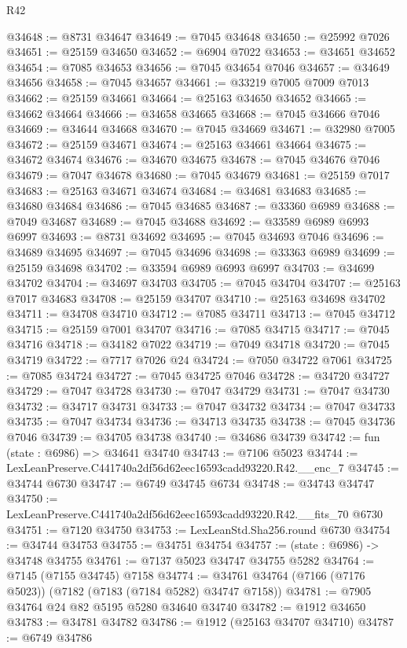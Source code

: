 \begin{lexlean}{R42}
\begin{coremodule}
{@34648 := @8731 @34647
@34649 := @7045 @34648
@34650 := @25992 @7026
@34651 := @25159 @34650
@34652 := @6904 @7022
@34653 := @34651 @34652
@34654 := @7085 @34653
@34656 := @7045 @34654 @7046
@34657 := @34649 @34656
@34658 := @7045 @34657
@34661 := @33219 @7005 @7009 @7013
@34662 := @25159 @34661
@34664 := @25163 @34650 @34652
@34665 := @34662 @34664
@34666 := @34658 @34665
@34668 := @7045 @34666 @7046
@34669 := @34644 @34668
@34670 := @7045 @34669
@34671 := @32980 @7005
@34672 := @25159 @34671
@34674 := @25163 @34661 @34664
@34675 := @34672 @34674
@34676 := @34670 @34675
@34678 := @7045 @34676 @7046
@34679 := @7047 @34678
@34680 := @7045 @34679
@34681 := @25159 @7017
@34683 := @25163 @34671 @34674
@34684 := @34681 @34683
@34685 := @34680 @34684
@34686 := @7045 @34685
@34687 := @33360 @6989
@34688 := @7049 @34687
@34689 := @7045 @34688
@34692 := @33589 @6989 @6993 @6997
@34693 := @8731 @34692
@34695 := @7045 @34693 @7046
@34696 := @34689 @34695
@34697 := @7045 @34696
@34698 := @33363 @6989
@34699 := @25159 @34698
@34702 := @33594 @6989 @6993 @6997
@34703 := @34699 @34702
@34704 := @34697 @34703
@34705 := @7045 @34704
@34707 := @25163 @7017 @34683
@34708 := @25159 @34707
@34710 := @25163 @34698 @34702
@34711 := @34708 @34710
@34712 := @7085 @34711
@34713 := @7045 @34712
@34715 := @25159 @7001 @34707
@34716 := @7085 @34715
@34717 := @7045 @34716
@34718 := @34182 @7022
@34719 := @7049 @34718
@34720 := @7045 @34719
@34722 := @7717 @7026 @24
@34724 := @7050 @34722 @7061
@34725 := @7085 @34724
@34727 := @7045 @34725 @7046
@34728 := @34720 @34727
@34729 := @7047 @34728
@34730 := @7047 @34729
@34731 := @7047 @34730
@34732 := @34717 @34731
@34733 := @7047 @34732
@34734 := @7047 @34733
@34735 := @7047 @34734
@34736 := @34713 @34735
@34738 := @7045 @34736 @7046
@34739 := @34705 @34738
@34740 := @34686 @34739
@34742 := fun (state : @6986) => @34641 @34740
@34743 := @7106 @5023
@34744 := LexLeanPreserve.C441740a2df56d62eec16593cadd93220.R42.__enc_7
@34745 := @34744 @6730
@34747 := @6749 @34745 @6734
@34748 := @34743 @34747
@34750 := LexLeanPreserve.C441740a2df56d62eec16593cadd93220.R42.__fits_70 @6730
@34751 := @7120 @34750
@34753 := LexLeanStd.Sha256.round @6730
@34754 := @34744 @34753
@34755 := @34751 @34754
@34757 := (state : @6986) -> @34748 @34755
@34761 := @7137 @5023 @34747 @34755 @5282
@34764 := @7145 (@7155 @34745) @7158
@34774 := @34761 @34764 (@7166 (@7176 @5023)) (@7182 (@7183 (@7184 @5282) @34747 @7158))
@34781 := @7905 @34764 @24 @82 @5195 @5280 @34640 @34740
@34782 := @1912 @34650
@34783 := @34781 @34782
@34786 := @1912 (@25163 @34707 @34710)
@34787 := @6749 @34786
}
\end{coremodule}
\end{lexlean}
